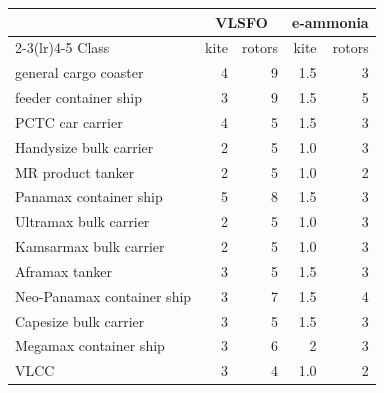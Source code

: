 \begin{tabular}{@{}lrrrr}
\toprule
 & \multicolumn{2}{c}{VLSFO} & \multicolumn{2}{c}{e-ammonia} \\
\cmidrule(lr){2-3}\cmidrule(lr){4-5}
Class & kite & rotors & kite & rotors \\
\midrule
general cargo coaster & \cellcolor{gain!10}4 & \cellcolor{gain!5}9 & \cellcolor{gain!30}1.5 & \cellcolor{gain!14}3 \\
feeder container ship & \cellcolor{gain!15}3 & \cellcolor{gain!4}9 & \cellcolor{gain!31}1.5 & \cellcolor{gain!8}5 \\
PCTC car carrier & \cellcolor{gain!10}4 & \cellcolor{gain!8}5 & \cellcolor{gain!23}1.5 & \cellcolor{gain!14}3 \\
Handysize bulk carrier & \cellcolor{gain!18}2 & \cellcolor{gain!8}5 & \cellcolor{gain!40}1.0 & \cellcolor{gain!15}3 \\
MR product tanker & \cellcolor{gain!20}2 & \cellcolor{gain!8}5 & \cellcolor{gain!36}1.0 & \cellcolor{gain!18}2 \\
Panamax container ship & \cellcolor{gain!9}5 & \cellcolor{gain!5}8 & \cellcolor{gain!24}1.5 & \cellcolor{gain!14}3 \\
Ultramax bulk carrier & \cellcolor{gain!18}2 & \cellcolor{gain!8}5 & \cellcolor{gain!34}1.0 & \cellcolor{gain!14}3 \\
Kamsarmax bulk carrier & \cellcolor{gain!18}2 & \cellcolor{gain!8}5 & \cellcolor{gain!34}1.0 & \cellcolor{gain!14}3 \\
Aframax tanker & \cellcolor{gain!16}3 & \cellcolor{gain!9}5 & \cellcolor{gain!29}1.5 & \cellcolor{gain!13}3 \\
Neo-Panamax container ship & \cellcolor{gain!13}3 & \cellcolor{gain!6}7 & \cellcolor{gain!26}1.5 & \cellcolor{gain!11}4 \\
Capesize bulk carrier & \cellcolor{gain!13}3 & \cellcolor{gain!8}5 & \cellcolor{gain!30}1.5 & \cellcolor{gain!13}3 \\
Megamax container ship & \cellcolor{gain!14}3 & \cellcolor{gain!7}6 & \cellcolor{gain!22}2 & \cellcolor{gain!14}3 \\
VLCC & \cellcolor{gain!16}3 & \cellcolor{gain!9}4 & \cellcolor{gain!37}1.0 & \cellcolor{gain!18}2 \\
\bottomrule
\end{tabular}
